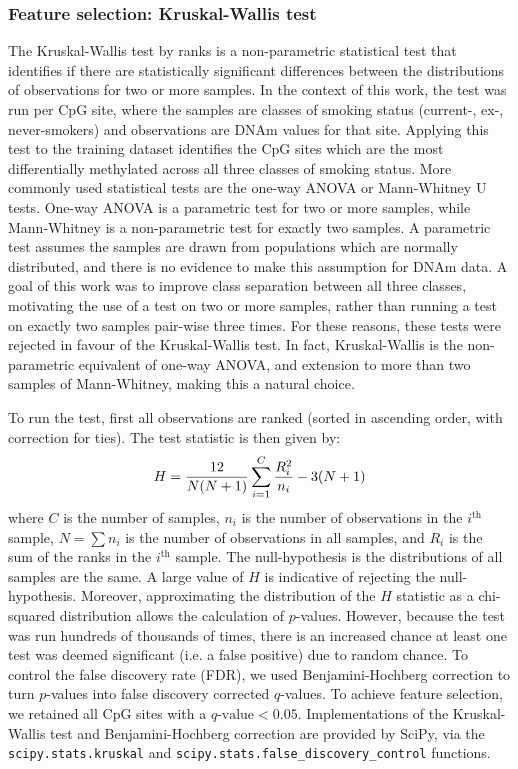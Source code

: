 \documentclass{article} %
\newcommand{\equationname}[1]{%
    \begingroup
        \leavevmode
        \addcontentsline{equ}{equations}{\protect\numberline{\theequation}#1}%
    \endgroup   
}
\begin{document}
\subsubsection{Feature selection: Kruskal-Wallis test} \label{sec:feature-selection}
The Kruskal-Wallis test by ranks \cite{Kruskal1952UseOR} is a non-parametric statistical test that identifies if there are statistically significant differences between the distributions of observations for two or more samples. In the context of this work, the test was run per CpG site, where the samples are classes of smoking status (current-, ex-, never-smokers) and observations are DNAm values for that site. Applying this test to the training dataset identifies the CpG sites which are the most differentially methylated across all three classes of smoking status. More commonly used statistical tests are the one-way ANOVA \cite{fisher1921probable} or Mann-Whitney U \cite{mann1947test} tests. One-way ANOVA is a parametric test for two or more samples, while Mann-Whitney is a non-parametric test for exactly two samples. A parametric test assumes the samples are drawn from populations which are normally distributed, and there is no evidence to make this assumption for DNAm data. A goal of this work was to improve class separation between all three classes, motivating the use of a test on two or more samples, rather than running a test on exactly two samples pair-wise three times. For these reasons, these tests were rejected in favour of the Kruskal-Wallis test. In fact, Kruskal-Wallis is the non-parametric equivalent of one-way ANOVA, and extension to more than two samples of Mann-Whitney, making this a natural choice.

To run the test, first all observations are ranked (sorted in ascending order, with correction for ties). The test statistic is then given by:
\begin{equation} \equationname{Kruskal-Wallis test by ranks}
    H = \frac{12}{N(N + 1)}\sum_{i=1}^{C}\frac{R_i^2}{n_i} - 3(N + 1)
\end{equation}
where \(C\) is the number of samples, \(n_i\) is the number of observations in the \(i^\text{th}\) sample, \(N = \sum n_i\) is the number of observations in all samples, and \(R_i\) is the sum of the ranks in the \(i^\text{th}\) sample. The null-hypothesis is the distributions of all samples are the same. A large value of \(H\) is indicative of rejecting the null-hypothesis. Moreover, approximating the distribution of the \(H\) statistic as a chi-squared distribution allows the calculation of \(p\)-values. However, because the test was run hundreds of thousands of times, there is an increased chance at least one test was deemed significant (i.e. a false positive) due to random chance. To control the false discovery rate (FDR), we used Benjamini-Hochberg correction \cite{benjamini1995controlling} to turn \(p\)-values into false discovery corrected \(q\)-values. To achieve feature selection, we retained all CpG sites with a \(q\text{-value} < 0.05\). Implementations of the Kruskal-Wallis test and Benjamini-Hochberg correction are provided by SciPy, via the \verb|scipy.stats.kruskal| and \verb|scipy.stats.false_discovery_control| functions.
\end{document}
